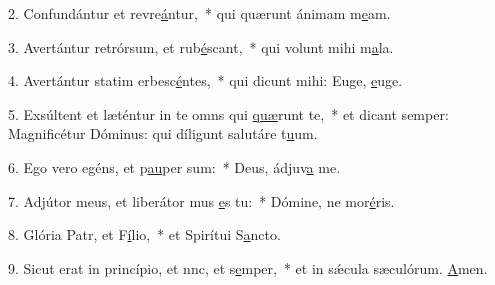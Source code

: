 2. Confundántur et revre\uline{á}ntur,~* qui quærunt ánimam m\uline{e}am.\par 
3. Avertántur retrórsum, et rub\uline{é}scant,~* qui volunt mihi m\uline{a}la.\par 
4. Avertántur statim erbesc\uline{é}ntes,~* qui dicunt mihi: Euge, \uline{e}uge.\par 
5. Exsúltent et læténtur in te omns qui \uline{quæ}runt te,~* et dicant semper: Magnificétur Dóminus: qui díligunt salutáre t\uline{u}um.\par 
6. Ego vero egéns, et p\uline{au}per sum:~* Deus, ádjuv\uline{a} me.\par 
7. Adjútor meus, et liberátor mus \uline{e}s tu:~* Dómine, ne mor\uline{é}ris.\par 
8. Glória Patr, et F\uline{í}lio,~* et Spirítui S\uline{a}ncto.\par 
9. Sicut erat in princípio, et nnc, et s\uline{e}mper,~* et in sǽcula sæculórum. \uline{A}men.\par 
